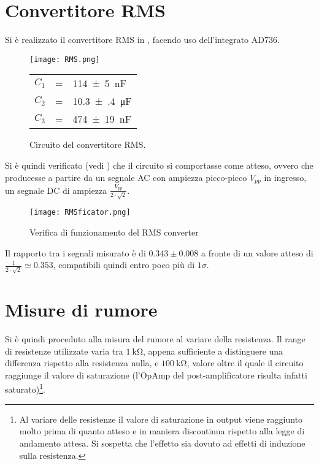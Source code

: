 \section{Convertitore RMS}
Si è realizzato il convertitore RMS in , facendo uso dell'integrato AD736.

	\begin{figure}[H]
		\begin{minipage}{0.70\textwidth}
			\centering
			\texttt{[image: RMS.png]}
			\caption{Circuito del convertitore RMS.}
			\label{fig:RMS}
		\end{minipage}
		\begin{minipage}{0.29\textwidth}
			\begin{tabular}{l@{ }c@{ }l}
				$C_{1}$& = &\SI{114(5)}{\nano\farad}\\
				$C_{2}$& = &\SI{10.3(4)}{\micro\farad}\\
				$C_3$& = &\SI{474(19)}{\nano\farad}\\
			\end{tabular}
		\end{minipage}
	\end{figure}
	
Si è quindi verificato (vedi ) che il circuito si comportasse come atteso, ovvero che producesse a partire da un segnale AC con ampiezza picco-picco $V_{pp}$ in ingresso, un segnale DC di ampiezza $\frac{V_{pp}}{2\cdot \sqrt{2}}$.

	\begin{figure}[H]
		\centering
		\texttt{[image: RMSficator.png]}
		\caption{Verifica di funzionamento del RMS converter}
		\label{fig:RMS_test}
	\end{figure}

Il rapporto tra i segnali misurato è di $0.343 \pm 0.008$ a fronte di un valore atteso di $\frac{1}{2\cdot\sqrt{2}} \simeq 0.353$, compatibili quindi entro poco più di $1\sigma$.

\section{Misure di rumore}
Si è quindi proceduto alla misura del rumore al variare della resistenza. Il range di resistenze utilizzate varia tra $\SI{1}{\kilo\ohm}$, appena sufficiente a distinguere una differenza rispetto alla resistenza nulla, e $\SI{100}{\kilo\ohm}$, valore oltre il quale il circuito raggiunge il valore di saturazione (l'OpAmp del post-amplificatore risulta infatti saturato)\footnote{Al variare delle resistenze il valore di saturazione in output viene raggiunto molto prima di quanto atteso e in maniera discontinua rispetto alla legge di andamento attesa. Si sospetta che l'effetto sia dovuto ad effetti di induzione sulla resistenza.}.

